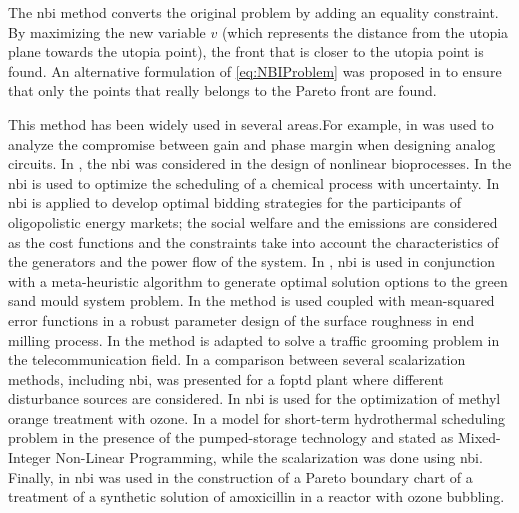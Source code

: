 The \gls{nbi} method converts the original problem by adding an equality constraint. By maximizing the new variable $v$ (which represents the distance from the utopia plane towards the utopia point), the front that is closer to the utopia point is found. An alternative formulation of \eqref{eq:NBIProblem} was proposed in \cite{Shukla2007} to ensure that only the points that really belongs to the Pareto front are found.

This method has been widely used in several areas.For example, in \cite{Stehr2003} was used to analyze the compromise between gain and phase margin when designing analog circuits. In \cite{Sendin2004}, the \gls{nbi} was considered in the design of nonlinear bioprocesses. In \cite{Ierapetritou2007a} the \gls{nbi} is used to optimize the scheduling of a chemical process with uncertainty. In \cite{Vahidinasab2010} \gls{nbi} is applied to develop optimal bidding strategies for the participants of oligopolistic energy markets; the social welfare and the emissions are considered as the cost functions and the constraints take into account the characteristics of the generators and the power flow of the system. In \cite{Ganesan2013}, \gls{nbi} is used in conjunction with a meta-heuristic algorithm to generate optimal solution options to the green sand mould system problem. In \cite{Brito2014} the method is used coupled with mean-squared error functions in a robust parameter design of the surface roughness in end milling process. In \cite{Rubio-Largo2014} the method is adapted to solve a traffic grooming problem in the telecommunication field. In \cite{Rojas2015b} a comparison between several scalarization methods, including \gls{nbi}, was presented for a \gls{foptd} plant where different disturbance sources are considered. In \cite{Naves2017} \gls{nbi} is used for the optimization of methyl orange treatment with ozone. In \cite{Simab2018} a model for short-term hydrothermal scheduling problem in the presence of the pumped-storage technology and stated as Mixed-Integer Non-Linear Programming, while the scalarization was done using \gls{nbi}. Finally, in \cite{Moura2018} \gls{nbi} was used in the construction of a Pareto boundary chart of a treatment of a synthetic solution of amoxicillin in a reactor with ozone bubbling.
